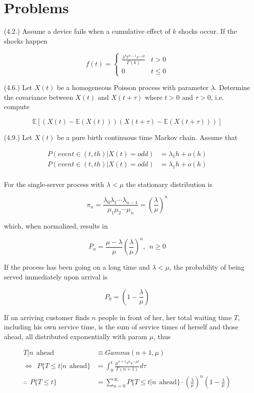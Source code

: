 \documentclass[12pt]{article}
\theoremstyle{nonumberbreak}
\begin{document}
\section{Problems}

(4.2.) Assume a device fails when a cumulative effect of $k$ shocks occur. If the shocks happen 

$$
f(t) = \begin{cases}
\frac{\lambda^k t^{k-1} e^{-\lambda t}}{\Gamma(k)} & t>0 \\[8pt]
0 & t \le 0
\end{cases}
$$


(4.6.) Let $X(t)$ be a homogeneous Poisson process with parameter $\lambda$. Determine the covariance between $X(t)$ and $X(t + \tau)$ where $t > 0$ and $\tau > 0$, i.e. compute

$$
\mathbb{E} \left[ \left( X(t) - \mathbb{E}(X(t)) \right) \left( X(t+\tau) - \mathbb{E}(X(t+\tau)) \right) \right]
$$



(4.9.) Let $X(t)$ be a pure birth continuous time Markov chain. Assume that 

$$
\begin{aligned}
P(event \in (t, th) | X(t) = odd) &= \lambda_1 h + o(h) \\[8pt]
P(event \in (t, th) | X(t) = odd) &= \lambda_1 h + o(h) \\[8pt]
\end{aligned}
$$


For the single-server process with $\lambda < \mu$ the stationary distribution is 

$$
\pi_n = \frac{\lambda_0 \lambda_1 \cdots \lambda_{n-1} }{\mu_1 \mu_2 \cdots \mu_n} = (\frac{\lambda}{\mu})^n
$$

which, when normalized, results in

$$
P_n = \frac{\mu - \lambda}{\mu} (\frac{\lambda}{\mu})^n, \ \ n \ge 0
$$


If the process has been going on a long time and $\lambda < \mu$, the probability of being served immediately upon arrival is 

$$
P_0 = (1 - \frac{\lambda}{\mu})
$$


If an arriving customer finds $n$ people in front of her, her total waiting time $T$, including his own service time, is the sum of service times of herself and those ahead, all distributed exponentially with param $\mu$, thus 

$$
\begin{aligned}
T | n \ \ \mathrm{ahead} &\equiv Gamma(n+1, \mu) \\[8pt]
\Leftrightarrow \ \ P \{ T \le t | n \ \ \mathrm{ahead}  \} &= \int_0^t \frac{\mu^{n+1} \tau^n e^{-\mu t} }{\Gamma(n+1)} d\tau \\[10pt]
\therefore \ \ P \{ T \le t\} &= \sum_{n=0}^\infty P \{ T \le t | n \ \ \mathrm{ahead} \} \cdot (\frac{\lambda}{\mu})^n (1 - \frac{\lambda}{\mu})
\end{aligned}
$$  
\end{document}
